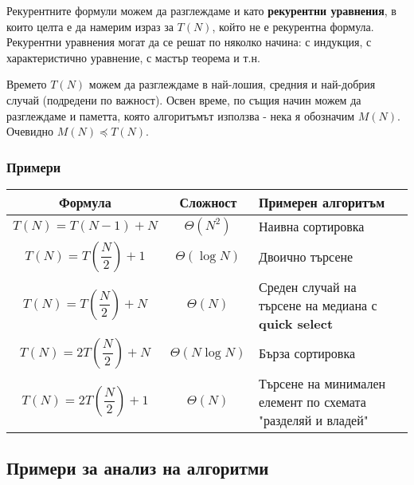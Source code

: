 \documentclass[fleqn,12pt]{article}
\begin{document}
Рекурентните формули можем да разглеждаме и като \textbf{рекурентни уравнения}, в които целта е да намерим израз за $T(N)$,
който не е рекурентна формула. Рекурентни уравнения могат да се решат по няколко начина: с индукция, с характеристично уравнение,
с мастър теорема и т.н.

Времето $T(N)$ можем да разглеждаме в най-лошия, средния и най-добрия случай (подредени по важност).
Освен време, по същия начин можем да разглеждаме и паметта, която алгоритъмът използва - нека я обозначим $M(N)$.
Очевидно $M(N) \preceq T(N)$.

\subsubsection{Примери}

\begin{center}
\begin{tabular}{|c|c|m{80mm}|}
    \hline
    Формула & Сложност & Примерен алгоритъм \\ 
    \hline
    $T(N) = T(N - 1) + N$ & $\Theta(N^2)$ & Наивна сортировка \\  
    \hline
    $T(N) = T\left(\dfrac{N}{2}\right) + 1$ & $\Theta(\log N)$ & Двоично търсене \\  
    \hline    
    $T(N) = T\left(\dfrac{N}{2}\right) + N$ & $\Theta(N)$ & Среден случай на търсене на медиана с \textbf{quick select} \\  
    \hline   
    $T(N) = 2T\left(\dfrac{N}{2}\right) + N$ & $\Theta(N \log N)$ & Бърза сортировка \\  
    \hline
    $T(N) = 2T\left(\dfrac{N}{2}\right) + 1$ & $\Theta(N)$ & Търсене на минимален елемент по схемата "разделяй и владей" \\  
    \hline     
\end{tabular}
\end{center}

\subsection{Примери за анализ на алгоритми}
\end{document}

